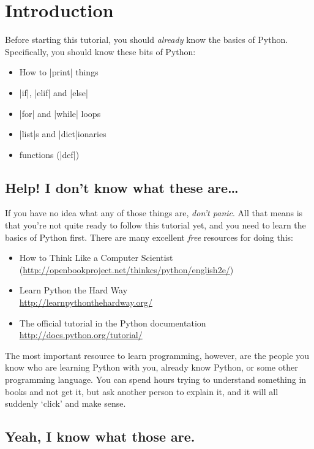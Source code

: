 \section{Introduction}

Before starting this tutorial, you should \emph{already} know the basics of
Python. Specifically, you should know these bits of Python:
\begin{itemize}
    \item How to \py|print| things
    \item \py|if|, \py|elif| and \py|else|
    \item \py|for| and \py|while| loops
    \item \py|list|s and \py|dict|ionaries
    \item functions (\py|def|)
\end{itemize}

\subsection{Help! I don’t know what these are…}

If you have no idea what any of those things are, \emph{don’t panic}.
All that means is that you’re not quite ready to follow this tutorial yet, and
you need to learn the basics of Python first.
There are many excellent \emph{free} resources for doing this:
\begin{itemize}
    \item How to Think Like a Computer Scientist \\
        (\url{http://openbookproject.net/thinkcs/python/english2e/})
    \item Learn Python the Hard Way \\
        \url{http://learnpythonthehardway.org/}
    \item The official tutorial in the Python documentation \\
        \url{http://docs.python.org/tutorial/}
\end{itemize}

The most important resource to learn programming, however, are the people you
know who are learning Python with you, already know Python, or some other
programming language.
You can spend hours trying to understand something in books and not get it,
but ask another person to explain it, and it will all suddenly ‘click’ and make
sense.

\subsection{Yeah, I know what those are.}

